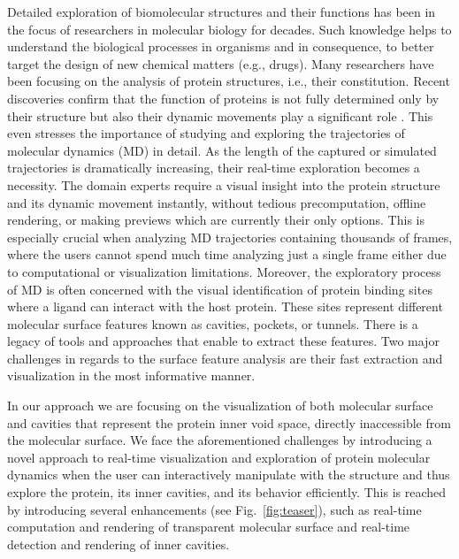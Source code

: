 
Detailed exploration of biomolecular structures and their functions has been in the focus of researchers in molecular biology for decades.
Such knowledge helps to understand the biological processes in organisms and in consequence, to better target the design of new chemical matters (e.g., drugs).
Many researchers have been focusing on the analysis of protein structures, i.e., their constitution. 
Recent discoveries confirm that the function of proteins is not fully determined only by their structure but also their dynamic movements play a significant role \cite{Hensen2012}.
This even stresses the importance of studying and exploring the trajectories of molecular dynamics (MD) in detail. 
As the length of the captured or simulated trajectories is dramatically increasing, their real-time exploration becomes a necessity.
The domain experts require a visual insight into the protein structure and its dynamic movement instantly, without tedious precomputation, offline rendering, or making previews which are currently their only options.
This is especially crucial when analyzing MD trajectories containing thousands of frames, where the users cannot spend much time analyzing just a single frame either due to computational or visualization limitations. 
Moreover, the exploratory process of MD is often concerned with the visual identification of protein binding sites where a ligand can interact with the host protein.
These sites represent different molecular surface features known as cavities, pockets, or tunnels.
There is a legacy of tools and approaches that enable to extract these features.
Two major challenges in regards to the surface feature analysis are their fast extraction and visualization in the most informative manner. 

In our approach we are focusing on the visualization of both molecular surface and cavities that represent the protein inner void space, directly inaccessible from the molecular surface. 
We face the aforementioned challenges by introducing a novel approach to real-time visualization and exploration of protein molecular dynamics when the user can interactively manipulate with the structure and thus explore the protein, its inner cavities, and its behavior efficiently. 
This is reached by introducing several enhancements (see Fig.~\ref{fig:teaser}), such as real-time computation and rendering of transparent molecular surface and real-time detection and rendering of inner cavities.

